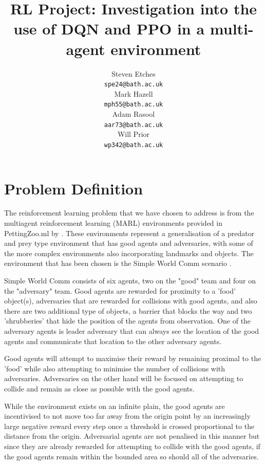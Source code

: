 \documentclass{article}
\title{RL Project: Investigation into the use of DQN and PPO in a multi-agent environment}
\author{
  Steven Etches \\
  \texttt{spe24@bath.ac.uk} \\
  \And
  Mark Hazell \\
  \texttt{mph55@bath.ac.uk} \\
  \And
  Adam Rasool \\
  \texttt{aar73@bath.ac.uk} \\
  \And
  Will Prior \\
  \texttt{wp342@bath.ac.uk}
}
\begin{document}
\maketitle

\section{Problem Definition} \label{Problem Definition}

The reinforcement learning problem that we have chosen to address is from the multiagent reinforcement learning (MARL) environments provided in PettingZoo.ml by \citet{terry2020pettingzoo}.
These environments represent a generalisation of a predator and prey type environment that has good agents and adversaries, with some of the more complex environments also incorporating landmarks and objects.
The environment that has been chosen is the Simple World Comm scenario \citet{mordatch2017emergence}.

Simple World Comm consists of six agents, two on the "good" team and four on the "adversary" team.
Good agents are rewarded for proximity to a 'food' object(s), adversaries that are rewarded for collisions with good agents, and also there are two additional type of objects, a barrier that blocks the way and two 'shrubberies' that hide the position of the agents from observation.
One of the adversary agents is leader adversary that can always see the location of the good agents and communicate that location to the other adversary agents.

Good agents will attempt to maximise their reward by remaining proximal to the 'food' while also attempting to minimise the number of collisions with adversaries.
Adversaries on the other hand will be focused on attempting to collide and remain as close as possible with the good agents.

While the environment exists on an infinite plain, the good agents are incentivised to not move too far away from the origin point by an increasingly large negative reward every step once a threshold is crossed proportional to the distance from the origin.
Adversarial agents are not penalised in this manner but since they are already rewarded for attempting to collide with the good agents, if the good agents remain within the bounded area so should all of the adversaries.
\end{document}
